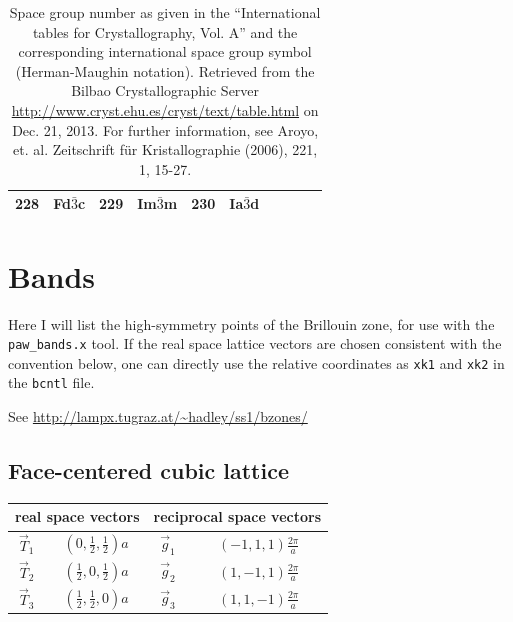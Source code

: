 \documentclass[final,12pt]{article}
\begin{document}
{{{{{{\begin{table}[!h]
\begin{center}
\begin{tabular}{||r|l||r|l||r|l||r|l||r|l||}
228    & Fd$\bar{3}$c       & 
229    & Im$\bar{3}$m       & 
230    & Ia$\bar{3}$d       \\
\hline
\end{tabular}
\end{center}
\caption{\label{table:spacegroupnumber_b}Space group number as given
  in the ``International tables for Crystallography, Vol. A'' and the
  corresponding international space group symbol (Herman-Maughin
  notation). Retrieved from the Bilbao Crystallographic Server
  \url{http://www.cryst.ehu.es/cryst/text/table.html} on Dec. 21,
  2013.  For further information, see Aroyo, et. al. Zeitschrift f\"ur
  Kristallographie (2006), 221, 1, 15-27.  }
\end{table}


\newpage
\section{Bands}
Here I will list the high-symmetry points of the Brillouin zone, for
use with the \verb|paw_bands.x| tool. If the real space lattice vectors are
chosen consistent with the convention below, one can directly use the
relative coordinates as \verb|xk1| and \verb|xk2| in the \verb|bcntl|
file.

See \url{http://lampx.tugraz.at/~hadley/ss1/bzones/}

\subsection{Face-centered cubic lattice}
\begin{center}
\renewcommand\arraystretch{1.5}
\begin{tabular}{||c|c||c|c||}
\hline
\multicolumn{2}{|c|}{real space vectors} &
\multicolumn{2}{|c|}{reciprocal space vectors} \\
\hline
$\vec{T}_1$ & $(0,\frac{1}{2},\frac{1}{2}) a$ &
$\vec{g}_1$ & $(-1,1,1)\frac{2\pi}{a}$ \\
$\vec{T}_2$ & $(\frac{1}{2},0,\frac{1}{2}) a$ &
$\vec{g}_2$ & $(1,-1,1)\frac{2\pi}{a}$ \\
$\vec{T}_3$ & $(\frac{1}{2},\frac{1}{2},0) a$ &
$\vec{g}_3$ & $(1,1,-1)\frac{2\pi}{a}$ \\
\hline
\end{tabular}
\renewcommand\arraystretch{1.}
\end{center}

}}}}}}
\end{document}
